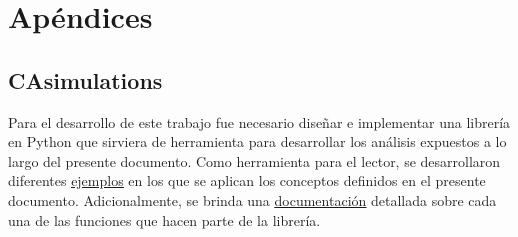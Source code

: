 \chapter{Apéndices}

\section{CAsimulations}\label{CAsimulations}

Para el desarrollo de este trabajo fue necesario diseñar e implementar una librería en Python que sirviera de herramienta para desarrollar los análisis expuestos a lo largo del presente documento. Como herramienta para el lector, se desarrollaron diferentes \href{https://github.com/Grupo-de-simulacion-con-automatas/Prediccion-del-comportamiento-de-una-enfermedad-simulada-en-AC-con-un-algoritmo-en-RN/tree/master/Codigo}{\underline{ejemplos}} en los que se aplican los conceptos definidos en el presente documento. Adicionalmente, se brinda una \href{https://github.com/Grupo-de-simulacion-con-automatas/Prediccion-del-comportamiento-de-una-enfermedad-simulada-en-AC-con-un-algoritmo-en-RN/tree/master/Codigo/EpidemiologicalModels}{\underline{documentación}} detallada sobre cada una de las funciones que hacen parte de la librería.


